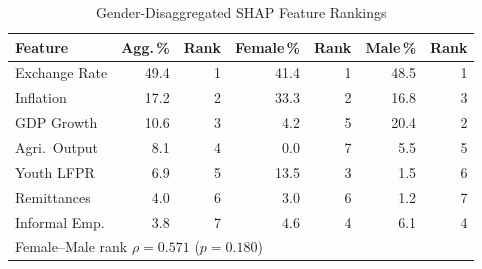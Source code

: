 \begin{table}[htbp]
\caption{Gender-Disaggregated SHAP Feature Rankings}
\label{tab:gender_shap}
\centering
\footnotesize
\begin{tabular}{lrrrrrr}
\toprule
\textbf{Feature} & \textbf{Agg.\,\%} & \textbf{Rank} & \textbf{Female\,\%} & \textbf{Rank} & \textbf{Male\,\%} & \textbf{Rank}\\
\midrule
Exchange Rate & 49.4 & 1 & 41.4 & 1 & 48.5 & 1\\
Inflation & 17.2 & 2 & 33.3 & 2 & 16.8 & 3\\
GDP Growth & 10.6 & 3 & 4.2 & 5 & 20.4 & 2\\
Agri.\ Output & 8.1 & 4 & 0.0 & 7 & 5.5 & 5\\
Youth LFPR & 6.9 & 5 & 13.5 & 3 & 1.5 & 6\\
Remittances & 4.0 & 6 & 3.0 & 6 & 1.2 & 7\\
Informal Emp. & 3.8 & 7 & 4.6 & 4 & 6.1 & 4\\
\midrule
\multicolumn{7}{l}{\scriptsize Female--Male rank $\rho = 0.571$ ($p = 0.180$)}\\
\bottomrule
\end{tabular}
\end{table}
